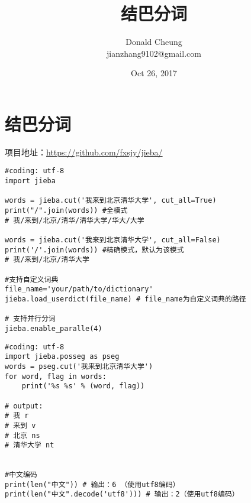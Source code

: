 \documentclass[10pt,a4paper]{ctexbook}
\begin{document}
    \setlength{\baselineskip}{20pt}
    \title{结巴分词}
    \author{Donald Cheung\\jianzhang9102@gmail.com}
    \date{Oct 26, 2017}
    \tableofcontents
\fi

\chapter{结巴分词}

项目地址：\url{https://github.com/fxsjy/jieba/}

\begin{verbatim}
#coding: utf-8
import jieba

words = jieba.cut('我来到北京清华大学', cut_all=True)
print("/".join(words)) #全模式
# 我/来到/北京/清华/清华大学/华大/大学

words = jieba.cut('我来到北京清华大学', cut_all=False)
print('/'.join(words)) #精确模式，默认为该模式
# 我/来到/北京/清华大学

#支持自定义词典
file_name='your/path/to/dictionary'
jieba.load_userdict(file_name) # file_name为自定义词典的路径

# 支持并行分词
jieba.enable_paralle(4)
\end{verbatim}

\begin{verbatim}
#coding: utf-8
import jieba.posseg as pseg
words = pseg.cut('我来到北京清华大学')
for word, flag in words:
    print('%s %s' % (word, flag))

# output:
# 我 r
# 来到 v
# 北京 ns
# 清华大学 nt


#中文编码
print(len("中文")) # 输出：6 （使用utf8编码）
print(len("中文".decode('utf8'))) # 输出：2（使用utf8编码）


\end{verbatim}



\ifx\mlbook\undefined
    
\end{document}

